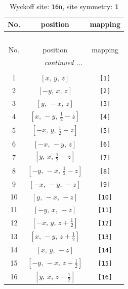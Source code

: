 \documentclass[fleqn,8pt]{jsarticle}
\begin{document}
\begin{longtable}{ccc}
\caption{Wyckoff site: {\tt 16n}, site symmetry: {\tt 1}}
 \\
 \hline \hline
No. & position & mapping \\ \hline \endfirsthead

\multicolumn{2}{l}{\tablename\ \thetable{}} \\
 \hline \hline
No. & position & mapping \\ \hline \endhead

 \hline \hline
\multicolumn{2}{r}{\footnotesize\it continued ...} \\ \endfoot

 \hline \hline
\multicolumn{2}{r}{} \\ \endlastfoot

1 & $\left[ x,\, y,\, z \right]$ & {\tt [1]} \\ \hline
2 & $\left[ - y,\, x,\, z \right]$ & {\tt [2]} \\ \hline
3 & $\left[ y,\, - x,\, z \right]$ & {\tt [3]} \\ \hline
4 & $\left[ x,\, - y,\, \frac{1}{2} - z \right]$ & {\tt [4]} \\ \hline
5 & $\left[ - x,\, y,\, \frac{1}{2} - z \right]$ & {\tt [5]} \\ \hline
6 & $\left[ - x,\, - y,\, z \right]$ & {\tt [6]} \\ \hline
7 & $\left[ y,\, x,\, \frac{1}{2} - z \right]$ & {\tt [7]} \\ \hline
8 & $\left[ - y,\, - x,\, \frac{1}{2} - z \right]$ & {\tt [8]} \\ \hline
9 & $\left[ - x,\, - y,\, - z \right]$ & {\tt [9]} \\ \hline
10 & $\left[ y,\, - x,\, - z \right]$ & {\tt [10]} \\ \hline
11 & $\left[ - y,\, x,\, - z \right]$ & {\tt [11]} \\ \hline
12 & $\left[ - x,\, y,\, z + \frac{1}{2} \right]$ & {\tt [12]} \\ \hline
13 & $\left[ x,\, - y,\, z + \frac{1}{2} \right]$ & {\tt [13]} \\ \hline
14 & $\left[ x,\, y,\, - z \right]$ & {\tt [14]} \\ \hline
15 & $\left[ - y,\, - x,\, z + \frac{1}{2} \right]$ & {\tt [15]} \\ \hline
16 & $\left[ y,\, x,\, z + \frac{1}{2} \right]$ & {\tt [16]} \\
\end{longtable}
\end{document}
